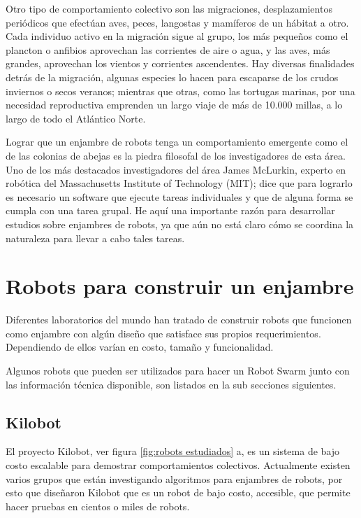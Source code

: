 Otro tipo de comportamiento colectivo son las migraciones, desplazamientos periódicos que efectúan aves, peces, langostas y mamíferos de un hábitat a otro. Cada individuo activo en la migración sigue al grupo, los más pequeños como el plancton o anfibios aprovechan las corrientes de aire o agua, y las aves, más grandes, aprovechan los vientos y corrientes ascendentes. Hay diversas finalidades detrás de la migración, algunas especies lo hacen para escaparse de los crudos inviernos o secos veranos; mientras que otras, como las tortugas marinas, por una necesidad reproductiva emprenden un largo viaje de más de 10.000 millas, a lo largo de todo el Atlántico Norte.

Lograr que un enjambre de robots tenga un comportamiento emergente como el de las colonias de abejas es la piedra filosofal de los investigadores de esta área. Uno de los más destacados investigadores del área James McLurkin, experto en robótica del Massachusetts Institute of Technology (MIT); dice que para lograrlo es necesario un software que ejecute tareas individuales y     que de alguna forma se cumpla con una tarea grupal. He aquí una importante razón para desarrollar estudios sobre enjambres de robots, ya que aún no está claro cómo se coordina la naturaleza para llevar a cabo tales tareas.

\section{Robots para construir un enjambre}

Diferentes laboratorios del mundo han tratado de construir robots que funcionen como enjambre con algún diseño que satisface sus propios requerimientos. Dependiendo de ellos varían en costo, tamaño y funcionalidad.

Algunos robots que pueden ser utilizados para hacer un Robot Swarm junto con las información técnica disponible, son listados en la sub secciones siguientes.

\subsection{Kilobot}
El proyecto Kilobot, ver figura \ref{fig:robots estudiados} a, es un sistema de bajo costo escalable para demostrar comportamientos colectivos. Actualmente existen varios grupos que están investigando algoritmos para enjambres de robots, por esto que diseñaron Kilobot que es un robot de bajo costo, accesible,  que permite hacer pruebas en cientos o miles de robots.

